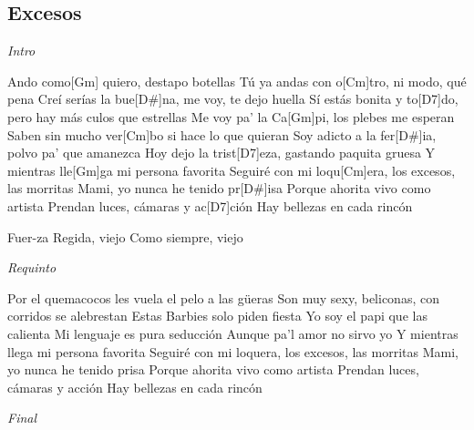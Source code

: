 \subsection{Excesos }

\noindent
\vspace{1cm}

\begin{guitar}
	\begin{multicols}{2}
		
		\textit{Intro}
		\par

		Ando como[Gm] quiero, destapo botellas
		Tú ya andas con o[Cm]tro, ni modo, qué pena
		Creí serías la bue[D#]na, me voy, te dejo huella
		Sí estás bonita y to[D7]do, pero hay más culos que estrellas
		Me voy pa' la Ca[Gm]pi, los plebes me esperan
		Saben sin mucho ver[Cm]bo si hace lo que quieran
		Soy adicto a la fer[D#]ia, polvo pa' que amanezca
		Hoy dejo la trist[D7]eza, gastando paquita gruesa
		Y mientras lle[Gm]ga mi persona favorita
		Seguiré con mi loqu[Cm]era, los excesos, las morritas
		Mami, yo nunca he tenido pr[D#]isa
	Porque ahorita vivo como artista
	Prendan luces, cámaras y ac[D7]ción
	Hay bellezas en cada rincón
	\par
	Fuer-za Regida, viejo
	Como siempre, viejo
	\par
	\textit{Requinto}
	\par
	Por el quemacocos les vuela el pelo a las güeras
	Son muy sexy, beliconas, con corridos se alebrestan
	Estas Barbies solo piden fiesta
	Yo soy el papi que las calienta
	Mi lenguaje es pura seducción
	Aunque pa'l amor no sirvo yo
	Y mientras llega mi persona favorita
	Seguiré con mi loquera, los excesos, las morritas
	Mami, yo nunca he tenido prisa
	Porque ahorita vivo como artista
	Prendan luces, cámaras y acción
	Hay bellezas en cada rincón

		\par
		\textit{Final}
	\end{multicols}
\end{guitar}
